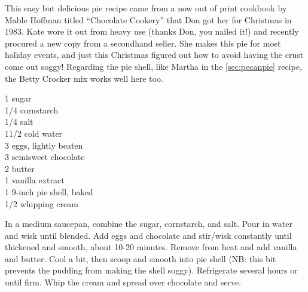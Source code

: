 \begin{open}
This easy but delicious pie recipe came from a now out of print cookbook by Mable Hoffman titled ``Chocolate Cookery'' that Don got her for Christmas in 1983. Kate wore it out from heavy use (thanks Don, you nailed it!) and recently procured a new copy from a secondhand seller. She makes this pie for most holiday events, and just this Christmas figured out how to avoid having the crust come out soggy! Regarding the pie shell, like Martha in the \ref{sec:pecanpie} recipe, the Betty Crocker mix works well here too.
\end{open}
\begin{ingredients}
    \SI{1}{\cup} sugar\\
    \SI{1/4}{\cup} cornstarch\\
    \SI{1/4}{\teaspoon} salt\\
    1\SI{1/2}{\cup} cold water\\
    3 eggs, lightly beaten \\
    \SI{3}{\ounce} semisweet chocolate \\
    \SI{2}{\tblspoon} butter \\
    \SI{1}{\teaspoon} vanilla extract\\
    1 9-inch pie shell, baked \\
    \SI{1/2}{\cup} whipping cream \\
\end{ingredients}


In a medium saucepan, combine the sugar, cornstarch, and salt. Pour in water and wisk until blended. Add eggs and chocolate and stir/wisk constantly until thickened and smooth, about 10-20 minutes. Remove from heat and add vanilla and butter. Cool a bit, then scoop and smooth into pie shell (NB: this bit prevents the pudding from making the shell soggy). Refrigerate several hours or until firm. Whip the cream and spread over chocolate and serve.